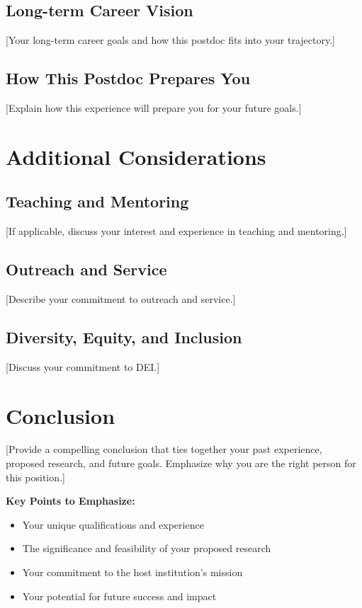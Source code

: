 \documentclass[11pt,a4paper]{article}
\begin{document}
\subsection{Long-term Career Vision}
[Your long-term career goals and how this postdoc fits into your trajectory.]

\subsection{How This Postdoc Prepares You}
[Explain how this experience will prepare you for your future goals.]

\section{Additional Considerations}
\subsection{Teaching and Mentoring}
[If applicable, discuss your interest and experience in teaching and mentoring.]

\subsection{Outreach and Service}
[Describe your commitment to outreach and service.]

\subsection{Diversity, Equity, and Inclusion}
[Discuss your commitment to DEI.]

\section{Conclusion}
[Provide a compelling conclusion that ties together your past experience, proposed research, and future goals. Emphasize why you are the right person for this position.]

\textbf{Key Points to Emphasize:}
\begin{itemize}
    \item Your unique qualifications and experience
    \item The significance and feasibility of your proposed research
    \item Your commitment to the host institution's mission
    \item Your potential for future success and impact
\end{itemize}
\end{document}

